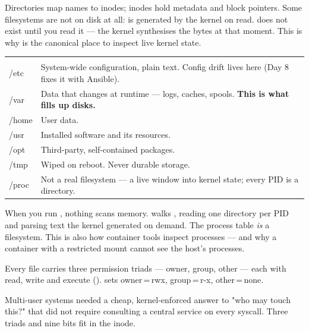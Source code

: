 Directories map names to inodes; inodes hold metadata and block pointers. Some filesystems are not on disk at all:  is generated by the kernel on read.  does not exist until you read it --- the kernel synthesises the bytes at that moment. This is why  is the canonical place to inspect live kernel state.

\begin{center}\small
\wbrowcolors
\begin{tabularx}{\linewidth}{@{}L{20mm} X@{}}
 & \\
/etc & System-wide configuration, plain text. Config drift lives here (Day 8 fixes it with Ansible).\\
/var & Data that changes at runtime --- logs, caches, spools. \textbf{This is what fills up disks.}\\
/home & User data.\\
/usr & Installed software and its resources.\\
/opt & Third-party, self-contained packages.\\
/tmp & Wiped on reboot. Never durable storage.\\
/proc & Not a real filesystem --- a live window into kernel state; every PID is a directory.\\
\end{tabularx}
\end{center}

\begin{behind}
When you run , nothing scans memory.  walks , reading one directory per PID and parsing text the kernel generated on demand. The process table \emph{is} a filesystem. This is also how container tools inspect processes --- and why a container with a restricted  mount cannot see the host's processes.
\end{behind}


 Every file carries three permission triads --- owner, group, other --- each with read, write and execute ().  sets owner\,=\,rwx, group\,=\,r-x, other\,=\,none.

 Multi-user systems needed a cheap, kernel-enforced answer to "who may touch this?" that did not require consulting a central service on every syscall. Three triads and nine bits fit in the inode.

